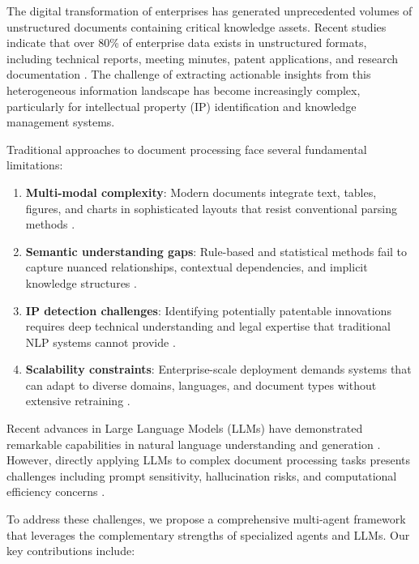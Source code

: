 \documentclass[11pt,a4paper]{article}
\begin{document}
The digital transformation of enterprises has generated unprecedented volumes of unstructured documents containing critical knowledge assets. Recent studies indicate that over 80\% of enterprise data exists in unstructured formats, including technical reports, meeting minutes, patent applications, and research documentation \citep{gandomi2015beyond}. The challenge of extracting actionable insights from this heterogeneous information landscape has become increasingly complex, particularly for intellectual property (IP) identification and knowledge management systems.

Traditional approaches to document processing face several fundamental limitations:

\begin{enumerate}[label=(\arabic*)]
  \item \textbf{Multi-modal complexity}: Modern documents integrate text, tables, figures, and charts in sophisticated layouts that resist conventional parsing methods \citep{li2024layoutlmv3}.
  
  \item \textbf{Semantic understanding gaps}: Rule-based and statistical methods fail to capture nuanced relationships, contextual dependencies, and implicit knowledge structures \citep{qiu2020pre}.
  
  \item \textbf{IP detection challenges}: Identifying potentially patentable innovations requires deep technical understanding and legal expertise that traditional NLP systems cannot provide \citep{aristodemou2024patent}.
  
  \item \textbf{Scalability constraints}: Enterprise-scale deployment demands systems that can adapt to diverse domains, languages, and document types without extensive retraining \citep{brown2020language}.
\end{enumerate}

Recent advances in Large Language Models (LLMs) have demonstrated remarkable capabilities in natural language understanding and generation \citep{openai2023gpt4, touvron2023llama}. However, directly applying LLMs to complex document processing tasks presents challenges including prompt sensitivity, hallucination risks, and computational efficiency concerns \citep{zhang2023instruction}.

To address these challenges, we propose a comprehensive multi-agent framework that leverages the complementary strengths of specialized agents and LLMs. Our key contributions include:
\end{document}
